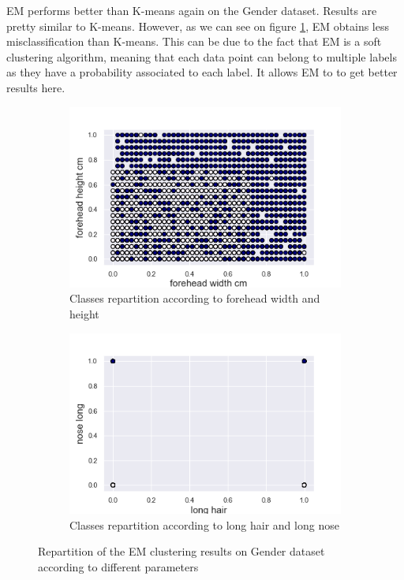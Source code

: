 \documentclass[twocolumn, 10pt]{article}
\begin{document}
			EM performs better than K-means again on the Gender dataset. Results are pretty similar to K-means. However, as we can see on figure \ref{fig:g_EM_sep}, EM obtains less misclassification than K-means. This can be due to the fact that EM is a soft clustering algorithm, meaning that each data point can belong to multiple labels as they have a probability associated to each label. It allows EM to to get better results here.

			\begin{figure}[h]
				\centering
				\begin{subfigure}[t]{.49\columnwidth}
					\centering
					\includegraphics[width=\linewidth]{../graphics/EM_forehead_width_cm_forehead_height_cm_label.png}
					\caption{Classes repartition according to forehead width and height}
					\label{fig:g_EM_sep}
				\end{subfigure}
				\begin{subfigure}[t]{.49\columnwidth}
					\centering
					\includegraphics[width=\linewidth]{../graphics/EM_long_hair_nose_long_label.png}
					\caption{Classes repartition according to long hair and long nose}
					\label{fig:g_EM_pet}
				\end{subfigure}
				\caption{Repartition of the EM clustering results on Gender dataset according to different parameters}
				\label{fig:g_EM}
			\end{figure}
\end{document}
